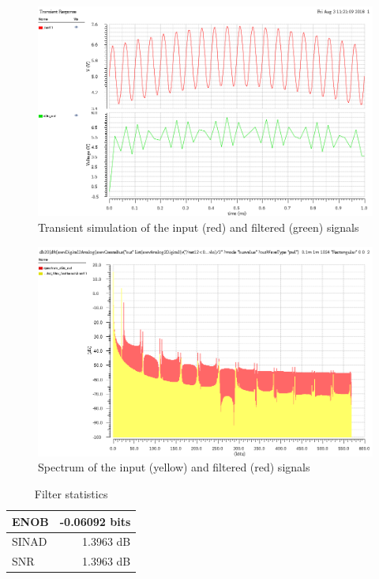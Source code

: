\begin{figure}[!h]
	\centering 
	\includegraphics[scale=0.6]{images/Filter/signal.png}
	\caption{Transient simulation of the input (red) and filtered (green) signals}
	\label{fig:filterCadenceTestbenchTransient}
\end{figure} 

\begin{figure}[!h]
	\centering 
	\includegraphics[scale=0.6]{images/Filter/spectrum.png}
	\caption{Spectrum of the input (yellow) and filtered (red) signals}
	\label{fig:filterCadenceTestbenchSpectrum}
\end{figure} 

\begin{table}[!h]
	\centering
	\begin{tabular}{|l|r|}
		\hline
		ENOB & -0.06092 bits \\
		\hline
		SINAD & 1.3963 dB \\
		\hline
		SNR & 1.3963 dB \\
		\hline
	\end{tabular}
	\caption{Filter statistics}
	\label{table:filterValues}
\end{table}

